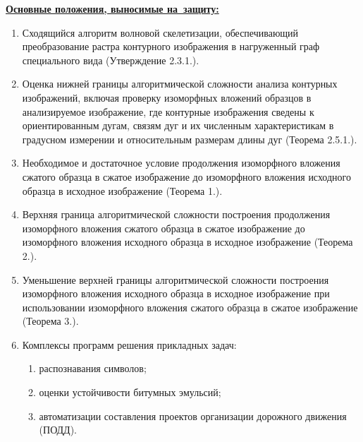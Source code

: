 \noindent
\underline{\textbf{Основные положения, выносимые на~защиту:}}
\begin{enumerate}
	\item Сходящийся алгоритм волновой скелетизации,  обеспечивающий преобразование растра контурного изображения в нагруженный граф специального вида (Утверждение 2.3.1.).
	\item Оценка нижней границы алгоритмической сложности  анализа контурных изображений, включая проверку изоморфных вложений образцов в анализируемое изображение, где контурные изображения сведены к ориентированным дугам, связям дуг и их численным характеристикам в градусном измерении и  относительным размерам  длины дуг  (Теорема 2.5.1.).
	\item Необходимое и достаточное условие продолжения изоморфного вложения сжатого образца в сжатое изображение до изоморфного вложения исходного образца в исходное изображение  (Теорема 1.).
	\item Верхняя граница алгоритмической сложности построения продолжения изоморфного вложения сжатого образца в сжатое изображение до изоморфного вложения исходного образца в исходное изображение  (Теорема 2.).
	\item Уменьшение верхней границы алгоритмической сложности построения  изоморфного вложения исходного образца в исходное изображение при использовании изоморфного вложения сжатого образца в сжатое изображение  (Теорема 3.).
	\item Комплексы программ  решения прикладных задач:
	\begin{enumerate}
		\item распознавания символов;
		\item оценки устойчивости битумных эмульсий;
		\item автоматизации составления проектов организации дорожного движения (ПОДД). 
	\end{enumerate}
\end{enumerate}

